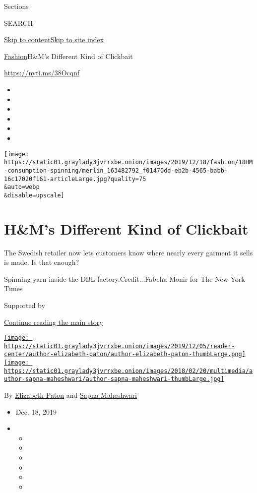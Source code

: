 Sections

SEARCH

\protect\hyperlink{site-content}{Skip to
content}\protect\hyperlink{site-index}{Skip to site index}

\href{/section/fashion}{Fashion}\textbar{}H\&M's Different Kind of
Clickbait

\url{https://nyti.ms/38Ocqnf}

\begin{itemize}
\item
\item
\item
\item
\item
\item
\end{itemize}

\texttt{[image: https://static01.graylady3jvrrxbe.onion/images/2019/12/18/fashion/18HM-consumption-spinning/merlin\_163482792\_f01470dd-eb2b-4565-babb-16c17020f161-articleLarge.jpg?quality=75\\\&auto=webp\\\&disable=upscale]}

\hypertarget{hms-different-kind-of-clickbait}{%
\section{H\&M's Different Kind of
Clickbait}\label{hms-different-kind-of-clickbait}}

The Swedish retailer now lets customers know where nearly every garment
it sells is made. Is that enough?

Spinning yarn inside the DBL factory.Credit...Fabeha Monir for The New
York Times

Supported by

\protect\hyperlink{after-sponsor}{Continue reading the main story}

\href{https://www.nytimes3xbfgragh.onion/by/elizabeth-paton}{\texttt{[image: https://static01.graylady3jvrrxbe.onion/images/2019/12/05/reader-center/author-elizabeth-paton/author-elizabeth-paton-thumbLarge.png]}}\href{https://www.nytimes3xbfgragh.onion/by/sapna-maheshwari}{\texttt{[image: https://static01.graylady3jvrrxbe.onion/images/2018/02/20/multimedia/author-sapna-maheshwari/author-sapna-maheshwari-thumbLarge.jpg]}}

By
\href{https://www.nytimes3xbfgragh.onion/by/elizabeth-paton}{Elizabeth
Paton} and
\href{https://www.nytimes3xbfgragh.onion/by/sapna-maheshwari}{Sapna
Maheshwari}

\begin{itemize}
\item
  Dec. 18, 2019
\item
  \begin{itemize}
  \item
  \item
  \item
  \item
  \item
  \item
  \end{itemize}
\end{itemize}

